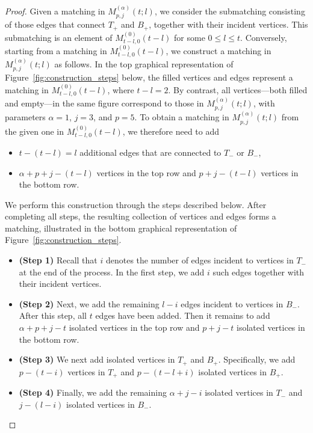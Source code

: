 \documentclass{amsart}
\theoremstyle{plain}
\theoremstyle{remark}
\numberwithin{equation}{section}
\begin{document}
\begin{proof}
Given a matching in $M_{p,j}^{(\alpha)}(t;l)$, we consider the submatching
consisting of those edges that connect $T_+$ and $B_+$, together with their incident vertices.
This submatching is an element of $M_{t-l,0}^{(0)}(t-l)$ for some $0 \le l \le t$.
Conversely, starting from a matching in $M_{t-l,0}^{(0)}(t-l)$, we construct a matching in $M_{p,j}^{(\alpha)}(t;l)$ as follows.
In the top graphical representation of Figure~\ref{fig:construction_steps} below, the filled vertices and edges represent a matching in $M_{t-l,0}^{(0)}(t-l)$, where $t-l=2$.
By contrast, all vertices---both filled and empty---in the same figure correspond to those in $M_{p,j}^{(\alpha)}(t;l)$, with parameters $\alpha=1$, $j=3$, and $p=5$.
To obtain a matching in $M_{p,j}^{(\alpha)}(t;l)$ from the given one in
$M_{t-l,0}^{(0)}(t-l)$, we therefore need to add
\begin{itemize}
     \item[(i)] $t-(t-l)=l$ additional edges that are connected to $T_-$ or $B_-$, 
     \smallskip 
    \item[(ii)] $\alpha+p+j-(t-l)$ vertices in the top row and $p+j-(t-l)$ vertices in the bottom row.
\end{itemize}
We perform this construction through the steps described below. After completing all steps, the resulting collection of vertices and edges forms a matching, illustrated in the bottom graphical representation of Figure~\ref{fig:construction_steps}. 
\begin{itemize}
    \item \textbf{(Step 1)} Recall that $i$ denotes the number of edges incident to vertices in $T_-$ at the end of the process.
    In the first step, we add $i$ such edges together with their incident
    vertices.
    \smallskip 
    \item \textbf{(Step 2)} Next, we add the remaining $l-i$ edges incident to vertices in $B_-$.
    After this step, all $t$ edges have been added.
    Then it remains to add $\alpha+p+j-t$ isolated vertices in the top row and $p+j-t$ isolated vertices in the bottom row.
    \smallskip 
    \item \textbf{(Step 3)} We next add isolated vertices in $T_+$ and $B_+$.
    Specifically, we add $p-(t-i)$ vertices in $T_+$ and
    $p-(t-l+i)$ isolated vertices in $B_+$.
    \smallskip 
    \item \textbf{(Step 4)}  Finally, we add the remaining $\alpha+j-i$ isolated vertices in $T_-$ and $j-(l-i)$ isolated vertices in $B_-$.
\end{itemize} 



\end{proof}
\end{document}
